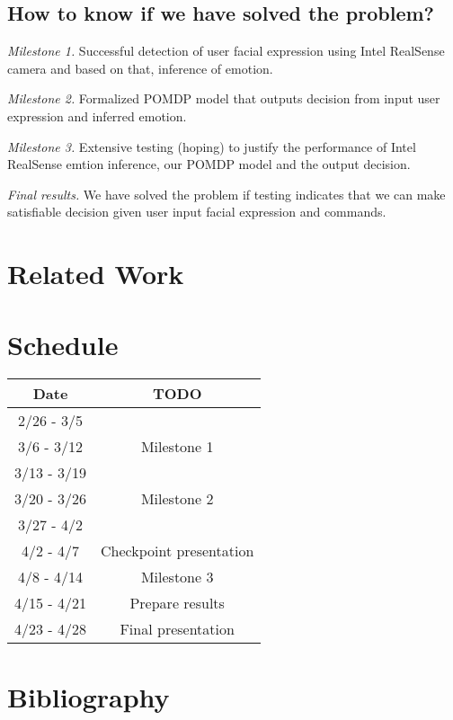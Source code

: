 \documentclass[12pt,letterpaper]{article}
\begin{document}
\subsection{How to know if we have solved the problem?}
\emph{Milestone 1.} Successful detection of user facial expression using Intel RealSense camera and based on that, inference of emotion.

\emph{Milestone 2.} Formalized POMDP model that outputs decision from input user expression and inferred emotion.

\emph{Milestone 3.} Extensive testing (hoping) to justify the performance of Intel RealSense emtion inference, our POMDP model and the output decision.

\emph{Final results.} We have solved the problem if testing indicates that we can make satisfiable decision given user input facial expression and commands. 
\section{Related Work}



\newpage
\section{Schedule}

\begin{center}
\begin{tabular}{ c | c }
\bf{Date} & \bf{TODO} \\ \hline
2/26 - 3/5 &  \\
3/6 - 3/12 &  Milestone 1\\
3/13 - 3/19 &  \\
3/20 - 3/26 &  Milestone 2\\
3/27 - 4/2 &  \\
4/2 - 4/7 & Checkpoint presentation\\
4/8 - 4/14 & Milestone 3\\
4/15 - 4/21 & Prepare results\\
4/23 - 4/28 & Final presentation
\end{tabular}
\end{center}

\section{Bibliography}
\end{document}
